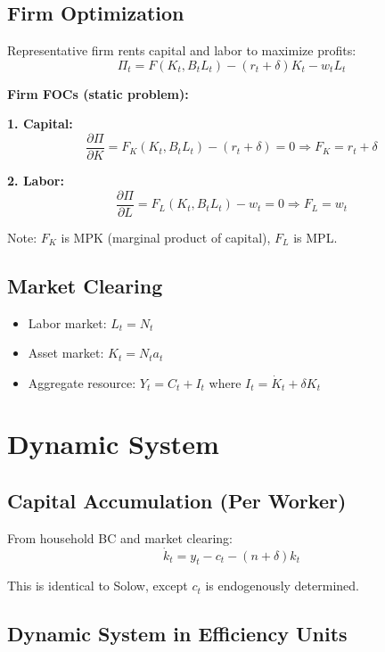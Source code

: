 \documentclass[a4paper,11pt]{article}
\begin{document}
\subsection*{Firm Optimization}
Representative firm rents capital and labor to maximize profits:
\[
\Pi_t = F(K_t, B_t L_t) - (r_t + \delta)K_t - w_t L_t
\]

\begin{derivationbox}
\textbf{Firm FOCs (static problem):}

\textbf{1. Capital:}
\[
\frac{\partial \Pi}{\partial K} = F_K(K_t, B_t L_t) - (r_t + \delta) = 0
\Rightarrow \boxed{F_K = r_t + \delta}
\tag{FOC-K}
\]

\textbf{2. Labor:}
\[
\frac{\partial \Pi}{\partial L} = F_L(K_t, B_t L_t) - w_t = 0
\Rightarrow \boxed{F_L = w_t}
\tag{FOC-L}
\]
\end{derivationbox}

Note: $F_K$ is MPK (marginal product of capital), $F_L$ is MPL.

\subsection*{Market Clearing}
\begin{itemize}
    \item Labor market: $L_t = N_t$
    \item Asset market: $K_t = N_t a_t$
    \item Aggregate resource: $Y_t = C_t + I_t$ where $I_t = \dot{K}_t + \delta K_t$
\end{itemize}

\section{Dynamic System}

\subsection*{Capital Accumulation (Per Worker)}

From household BC and market clearing:
\[
\dot{k}_t = y_t - c_t - (n + \delta)k_t
\tag{Capital-Law}
\]

This is identical to Solow, except $c_t$ is endogenously determined.

\subsection*{Dynamic System in Efficiency Units}
\end{document}
